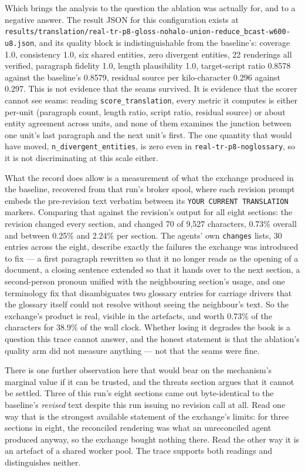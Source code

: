 \documentclass[11pt]{article}
\begin{document}
Which brings the analysis to the question the ablation was actually for, and to a negative answer.
The result JSON for this configuration exists at
\texttt{results/translation/real-tr-p8-gloss-nohalo-union-reduce\_bcast-w600-u8.json}, and its quality
block is indistinguishable from the baseline's: coverage 1.0, consistency 1.0, six shared entities,
zero divergent entities, 22 renderings all verified, paragraph fidelity 1.0, length plausibility 1.0,
target-script ratio 0.8578 against the baseline's 0.8579, residual source per kilo-character 0.296
against 0.297. This is not evidence that the seams survived. It is evidence that the scorer cannot
see seams: reading \texttt{score\_translation}, every metric it computes is either per-unit
(paragraph count, length ratio, script ratio, residual source) or about entity agreement across
units, and none of them examines the junction between one unit's last paragraph and the next unit's
first. The one quantity that would have moved, \texttt{n\_divergent\_entities}, is zero even in
\texttt{real-tr-p8-noglossary}, so it is not discriminating at this scale either.

What the record does allow is a measurement of what the exchange produced in the baseline, recovered
from that run's broker spool, where each revision prompt embeds the pre-revision text verbatim
between its \texttt{YOUR CURRENT TRANSLATION} markers. Comparing that against the revision's output
for all eight sections: the revision changed every section, and changed 70 of 9,527 characters, 0.73\%
overall and between 0.25\% and 2.24\% per section. The agents' own \texttt{changes} lists, 30 entries
across the eight, describe exactly the failures the exchange was introduced to fix --- a first
paragraph rewritten so that it no longer reads as the opening of a document, a closing sentence
extended so that it hands over to the next section, a second-person pronoun unified with the
neighbouring section's usage, and one terminology fix that disambiguates two glossary entries for
carriage drivers that the glossary itself could not resolve without seeing the neighbour's text. So
the exchange's product is real, visible in the artefacts, and worth 0.73\% of the characters for
38.9\% of the wall clock. Whether losing it degrades the book is a question this trace cannot answer,
and the honest statement is that the ablation's quality arm did not measure anything --- not that
the seams were fine.

There is one further observation here that would bear on the mechanism's marginal value if it can be
trusted, and the threats section argues that it cannot be settled. Three of this run's eight
sections came out byte-identical to the baseline's \emph{revised} text despite this run issuing no
revision call at all. Read one way that is the strongest available statement of the exchange's
limits: for three sections in eight, the reconciled rendering was what an unreconciled agent produced
anyway, so the exchange bought nothing there. Read the other way it is an artefact of a shared
worker pool. The trace supports both readings and distinguishes neither.
\end{document}
